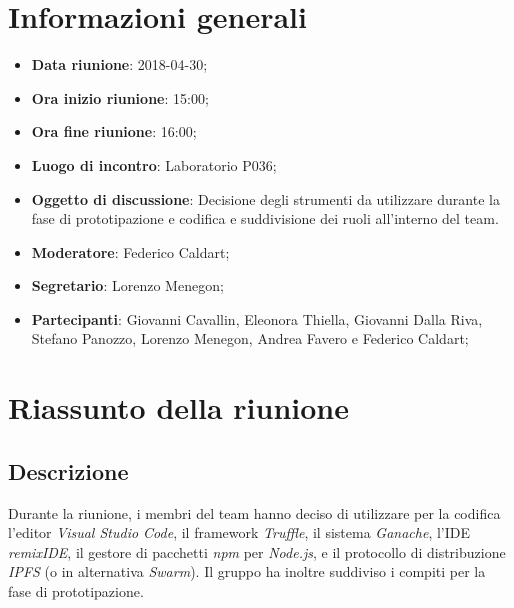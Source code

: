 \section{Informazioni generali}
	\begin{itemize}
		\item \textbf{Data riunione}: 2018-04-30;
		\item \textbf{Ora inizio riunione}: 15:00;
		\item \textbf{Ora fine riunione}: 16:00;
		\item \textbf{Luogo di incontro}: Laboratorio P036;
		\item \textbf{Oggetto di discussione}: Decisione degli strumenti da utilizzare durante la fase di prototipazione e codifica e suddivisione dei ruoli all'interno del team.
		\item \textbf{Moderatore}: Federico Caldart;
		\item \textbf{Segretario}: Lorenzo Menegon;
		\item \textbf{Partecipanti}: Giovanni Cavallin, Eleonora Thiella, Giovanni Dalla Riva, Stefano Panozzo, Lorenzo Menegon, Andrea Favero e Federico Caldart;
	\end{itemize}

\section{Riassunto della riunione}
	\subsection{Descrizione} Durante la riunione, i membri del team hanno deciso di utilizzare per la codifica l'editor \emph{Visual Studio Code}, il framework \emph{Truffle}, il sistema \emph{Ganache}, l'IDE \emph{remixIDE}, il gestore di pacchetti \emph{npm} per \emph{Node.js}, e il protocollo di distribuzione \emph{IPFS} (o in alternativa \emph{Swarm}). Il gruppo ha inoltre suddiviso i compiti per la fase di prototipazione.
	
